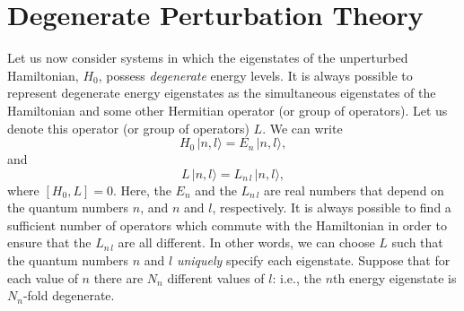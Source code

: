 \section{Degenerate Perturbation Theory}\label{s6.5}
Let us now consider systems  in which the eigenstates of
the unperturbed Hamiltonian, $H_0$,  possess
{\em degenerate}\/ energy levels. It is always possible to
represent degenerate energy eigenstates
as the simultaneous eigenstates 
of the Hamiltonian and some other Hermitian operator (or group
of operators). Let us denote this operator (or group of operators) $L$.
We can write
\begin{equation}
H_0\, |n, l\rangle = E_n\, |n, l\rangle,
\end{equation}
and
\begin{equation}
L\,|n,l\rangle = L_{n\,l}\, |n, l\rangle,
\end{equation}
where $[H_0, L] = 0$. Here, the $E_n$ and the $L_{n\,l}$ are real numbers that 
depend on the quantum numbers $n$, and $n$ and $l$, respectively.
 It is always possible
to find a sufficient number of operators which commute with the Hamiltonian
in order to ensure 
that the $L_{n\,l}$ are all different. In other words, we can
choose $L$ such that the quantum numbers
$n$ and $l$ {\em uniquely}\/ specify each eigenstate. Suppose that for each value
of $n$ there are $N_n$ different values of $l$: {\rm i.e.}, the $n$th energy eigenstate
is $N_n$-fold degenerate. 

